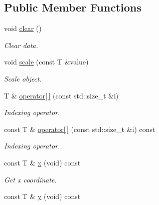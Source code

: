 \subsection*{Public Member Functions}
\begin{DoxyCompactItemize}
\item 
\mbox{\label{classddd_1_1row_object_a1da634f01207c96a25d5d53a74619afe}} 
void \hyperlink{classddd_1_1row_object_a1da634f01207c96a25d5d53a74619afe}{clear} ()
\begin{DoxyCompactList}\small\item\em Clear data. \end{DoxyCompactList}\item 
void \hyperlink{classddd_1_1row_object_a6c87f5fadb3b725f6c52cb08aed98eb2}{scale} (const T \&value)
\begin{DoxyCompactList}\small\item\em Scale object. \end{DoxyCompactList}\item 
T \& \hyperlink{classddd_1_1row_object_aff4fdb32f8b837e224b26de2bcecc7d2}{operator\mbox{[}$\,$\mbox{]}} (const std\+::size\+\_\+t \&i)
\begin{DoxyCompactList}\small\item\em Indexing operator. \end{DoxyCompactList}\item 
const T \& \hyperlink{classddd_1_1row_object_a60418f8af09e6913d16b48f2cb53e826}{operator\mbox{[}$\,$\mbox{]}} (const std\+::size\+\_\+t \&i) const
\begin{DoxyCompactList}\small\item\em Indexing operator. \end{DoxyCompactList}\item 
\mbox{\label{classddd_1_1row_object_a29439db5bbde399481c341cb66b7973e}} 
const T \& \hyperlink{classddd_1_1row_object_a29439db5bbde399481c341cb66b7973e}{x} (void) const
\begin{DoxyCompactList}\small\item\em Get x coordinate. \end{DoxyCompactList}\item 
\mbox{\label{classddd_1_1row_object_adac0d72ea44ad43b82f47b7a26010e4e}} 
const T \& \hyperlink{classddd_1_1row_object_adac0d72ea44ad43b82f47b7a26010e4e}{y} (void) const

\end{DoxyCompactItemize}
